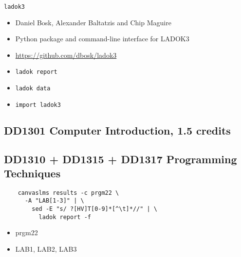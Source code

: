 \begin{frame}[fragile]
  \begin{block}{\texttt{ladok3}}
    \begin{itemize}
      \item Daniel Bosk, Alexander Baltatzis and Chip Maguire
      \item Python package and command-line interface for LADOK3
      \item \url{https://github.com/dbosk/ladok3}
    \end{itemize}
  \end{block}

  \begin{example}
    \begin{itemize}
      \item \texttt{ladok report}
      \item \texttt{ladok data}

        \pause

      \item \texttt{import ladok3}
    \end{itemize}
  \end{example}
\end{frame}

\subsection{DD1301 Computer Introduction, 1.5 credits}


\subsection{DD1310 + DD1315 + DD1317 Programming Techniques}

\begin{frame}[fragile]
  \begin{verbatim}
    canvaslms results -c prgm22 \
      -A "LAB[1-3]" | \
        sed -E "s/ ?[HV]T[0-9]*[^\t]*//" | \
          ladok report -f
  \end{verbatim}

  \begin{example}[Matching]
    \begin{itemize}
      \item prgm22
      \item LAB1, LAB2, LAB3
    \end{itemize}
  \end{example}
\end{frame}

